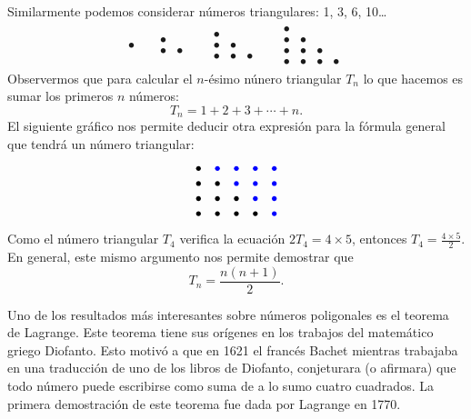 Similarmente podemos considerar números triangulares: 1, 3, 6, 10\dots
\begin{align*}
	\bullet
	&&
	\begin{array}{cc}
		\bullet\\
		\bullet & \bullet 
	\end{array}
	&&
	\begin{array}{ccc}
		\bullet\\
		\bullet & \bullet \\
		\bullet & \bullet & \bullet
	\end{array}
	&&
	\begin{array}{cccc}
		\bullet\\
		\bullet & \bullet \\
		\bullet & \bullet & \bullet\\
		\bullet & \bullet & \bullet & \bullet
	\end{array}
\end{align*}
Observermos que para calcular el $n$-ésimo núnero triangular $T_n$ lo que
hacemos es sumar los primeros $n$ números: 
\[
	T_n=1+2+3+\cdots+n.
\]
El siguiente gráfico nos permite deducir otra expresión para la fórmula general
que tendrá un número triangular:
\[
	\begin{array}{ccccc}
		\bullet & \textcolor{blue}{\bullet} & \textcolor{blue}{\bullet} & \textcolor{blue}{\bullet} & \textcolor{blue}{\bullet}\\
		\bullet & \bullet & \textcolor{blue}{\bullet} & \textcolor{blue}{\bullet} & \textcolor{blue}{\bullet}\\
		\bullet & \bullet & \bullet & \textcolor{blue}{\bullet} & \textcolor{blue}{\bullet} \\
		\bullet & \bullet & \bullet & \bullet & \textcolor{blue}{\bullet}
	\end{array}
\]
Como el número triangular $T_4$ verifica la ecuación $2T_4=4\times 5$, entonces
$T_4=\frac{4\times 5}{2}$. En general, este mismo argumento nos permite
demostrar que
\[
	T_n=\frac{n(n+1)}{2}.
\]

Uno de los resultados más interesantes sobre números poligonales es el teorema
de Lagrange. Este teorema tiene sus orígenes en los trabajos del matemático
griego Diofanto. Esto motivó a que en 1621 el francés Bachet mientras trabajaba
en una traducción de uno de los libros de Diofanto, conjeturara (o afirmara)
que todo número puede escribirse como suma de a lo sumo cuatro cuadrados. La
primera demostración de este teorema fue dada por Lagrange en 1770.

